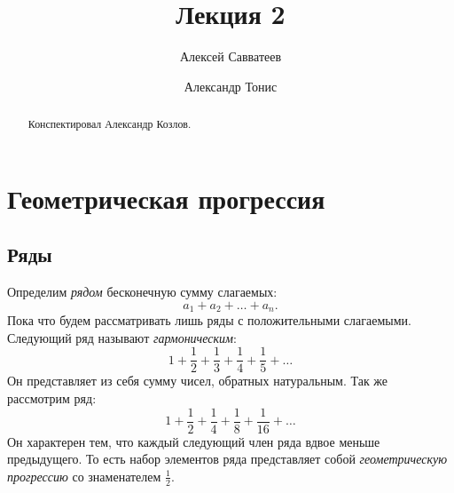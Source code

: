 \documentclass[12pt]{article}
\title{Лекция 2}
\author{Алексей Савватеев \and Александр Тонис}
\begin{document}
\maketitle
\begin{abstract}
Конспектировал Александр Козлов. 
\end{abstract}
\tableofcontents
\newpage
\section{Геометрическая прогрессия}
\subsection{Ряды}
Определим \emph{рядом} бесконечную сумму слагаемых:
\begin{equation}
    a_1 + a_2 + \ldots + a_n.
\end{equation}
Пока что будем рассматривать лишь ряды с положительными слагаемыми. Следующий ряд называют \emph{гармоническим}:
\begin{equation}\label{eq:1}
    1 + \dfrac{1}{2} + \dfrac13 + \dfrac14 + \dfrac15 + \ldots
\end{equation}
Он представляет из себя сумму чисел, обратных натуральным. Так же рассмотрим ряд:
\begin{equation}\label{eq:2}
    1 + \dfrac{1}{2} + \dfrac14 + \dfrac18 + \dfrac{1}{16} + \ldots
\end{equation}
Он характерен тем, что каждый следующий член ряда вдвое меньше предыдущего. То есть набор элементов ряда представляет собой \emph{геометрическую прогрессию} со знаменателем $\tfrac12$.
\end{document}
